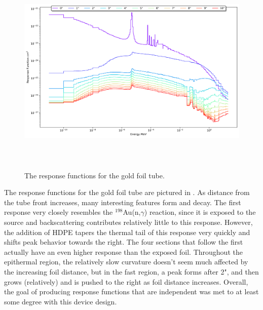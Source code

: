 \begin{figure}[htb]
\centering
\includegraphics[height=4in]{tex/figures/ft_au.png}
\caption[Gold Foil Tube Response Functions]{The response functions for the gold foil tube.}
\label{fig:ft_au_rfs}
\end{figure}

The response functions for the gold foil tube are pictured in .
As distance from the tube front increases, many interesting features form and decay.
The first response very closely resembles the $^{198}$Au(n,$\gamma$) reaction, since it is exposed to the source and backscattering contributes relatively little to this response.
However, the addition of HDPE tapers the thermal tail of this response very quickly and shifts peak behavior towards the right.
The four sections that follow the first actually have an even higher response than the exposed foil.
Throughout the epithermal region, the relatively slow curvature doesn't seem much affected by the increasing foil distance, but in the fast region, a peak forms after 2", and then grows (relatively) and is pushed to the right as foil distance increases.
Overall, the goal of producing response functions that are independent was met to at least some degree with this device design.

